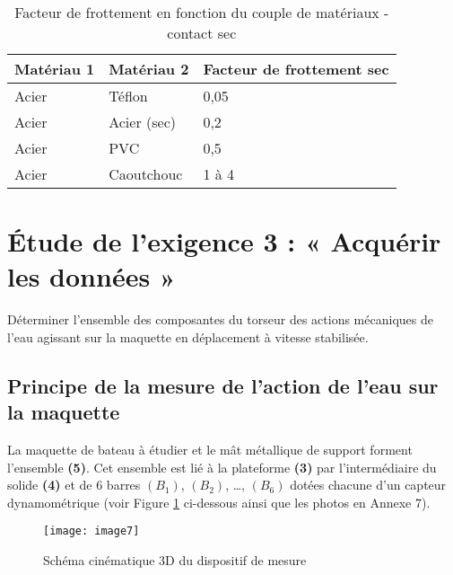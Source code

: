 \ifprof
\begin{corrige}
\end{corrige}
\else
\fi


\begin{table}[!h]
\centering
\begin{tabular}{lll}
\hline
\textbf{Matériau 1} & \textbf{Matériau 2} & \textbf{Facteur de frottement sec} \\ 
\hline
Acier	& Téflon & 0,05 \\
Acier	& Acier (sec) & 0,2\\
Acier	& PVC & 0,5\\
Acier	& Caoutchouc & 1 à 4\\
\hline
\end{tabular}
\caption{ \label{tab:CCMP:2021:01} Facteur de frottement en fonction du couple de matériaux - contact sec}
\end{table} 

\section{Étude de l'exigence 3 : « Acquérir les données »}
\begin{obj}
Déterminer l'ensemble des composantes du torseur des actions mécaniques de l'eau agissant sur la maquette en déplacement à vitesse stabilisée.
\end{obj}
\subsection{Principe de la mesure de l’action de l’eau sur la maquette}
La maquette de bateau à étudier et le mât métallique de support forment l’ensemble \textbf{\textbf{(5)}}. Cet ensemble est lié à la plateforme \textbf{(3)} par l’intermédiaire du solide \textbf{(4)} et de 6 barres 
$(B_1)$, $(B_2)$, …, $(B_6)$ dotées chacune d’un capteur dynamométrique (voir Figure \ref{fig:CCMP:2021:07} ci-dessous ainsi que les photos en Annexe 7).
 
\begin{figure}[!h]
\centering
\texttt{[image: image7]}
\caption{ \label{fig:CCMP:2021:07} Schéma cinématique 3D du dispositif de mesure}
\end{figure} 

